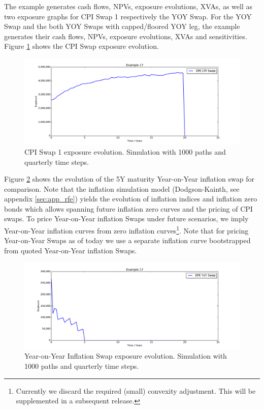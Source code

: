 \documentclass[12pt, a4paper]{article}
\begin{document}
{The example generates cash flows, NPVs, exposure evolutions, XVAs, as well as two exposure graphs for CPI Swap 1 respectively the YOY Swap. For the YOY Swap and the both YOY Swaps with capped/floored YOY leg, the example generates their cash flows, NPVs, exposure evolutions, XVAs and sensitivities. Figure \ref{fig_cpi_swap} shows the CPI Swap exposure evolution.

\begin{figure}[h!]
	\begin{center}
		\includegraphics[scale=0.45]{mpl_cpi_swap.pdf}
	\end{center}
	\caption{CPI Swap 1 exposure evolution. Simulation with 1000 paths and quarterly time steps.}
	\label{fig_cpi_swap}
\end{figure}

Figure \ref{fig_yoy_swap} shows the evolution of the 5Y maturity Year-on-Year inflation swap for comparison. Note that the inflation simulation model (Dodgson-Kainth, see appendix \ref{sec:app_rfe}) yields the evolution of inflation indices and inflation zero bonds which allows spanning future inflation zero curves and the pricing of CPI swaps. To price Year-on-Year inflation Swaps under future scenarios, we imply Year-on-Year inflation curves from zero inflation curves\footnote{Currently we discard the required (small) convexity adjustment. This will be supplemented in a subsequent release.}. Note that for pricing Year-on-Year Swaps as of today we use a separate inflation curve bootstrapped from quoted Year-on-Year inflation Swaps.
 
\begin{figure}[h!]
	\begin{center}
		\includegraphics[scale=0.45]{mpl_yoy_swap.pdf}
	\end{center}
	\caption{Year-on-Year Inflation Swap exposure evolution. Simulation with 1000 paths and quarterly time steps.}
	\label{fig_yoy_swap}
\end{figure}

}
\end{document}
